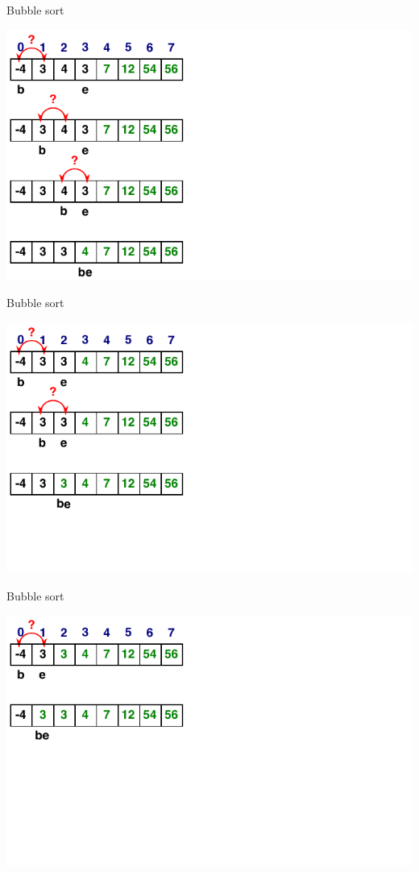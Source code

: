 \documentclass[usenames,dvipsnames,aspectratio=169]{beamer}
\begin{document}
\begin{frame}{Bubble sort}
  \begin{center}
    \includegraphics[scale=.9]{bubble_animation5.pdf}
  \end{center}
\end{frame}

\begin{frame}{Bubble sort}
  \begin{center}
    \includegraphics[scale=.9]{bubble_animation6.pdf}
  \end{center}
\end{frame}

\begin{frame}{Bubble sort}
  \begin{center}
    \includegraphics[scale=.9]{bubble_animation7.pdf}
  \end{center}
\end{frame}
\end{document}
